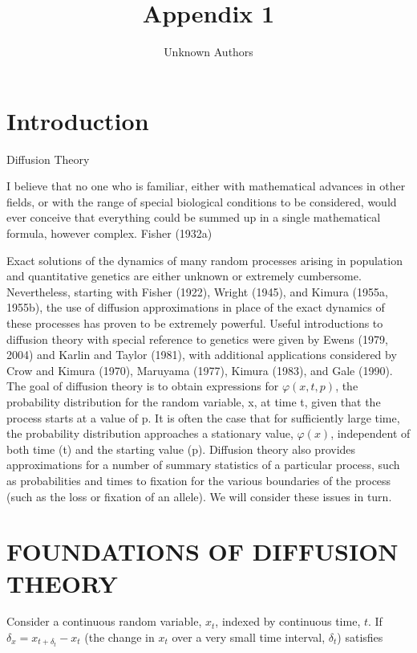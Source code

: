 \documentclass{article}
\title{Appendix 1}
\author{Unknown Authors}
\date{}
\begin{document}
\maketitle

\begin{abstract}

\end{abstract}

\section{Introduction}
Diffusion Theory

I believe that no one who is familiar, either with mathematical advances in other fields, or with the range of special biological conditions to be considered, would ever conceive that everything could be summed up in a single mathematical formula, however complex. Fisher (1932a)

Exact solutions of the dynamics of many random processes arising in population and quantitative genetics are either unknown or extremely cumbersome. Nevertheless, starting with Fisher (1922), Wright (1945), and Kimura (1955a, 1955b), the use of diffusion approximations in place of the exact dynamics of these processes has proven to be extremely powerful. Useful introductions to diffusion theory with special reference to genetics were given by Ewens (1979, 2004) and Karlin and Taylor (1981), with additional applications considered by Crow and Kimura (1970), Maruyama (1977), Kimura (1983), and Gale (1990). The goal of diffusion theory is to obtain expressions for  $ \varphi(x, t, p) $, the probability distribution for the random variable, x, at time t, given that the process starts at a value of p. It is often the case that for sufficiently large time, the probability distribution approaches a stationary value,  $ \varphi(x) $, independent of both time (t) and the starting value (p). Diffusion theory also provides approximations for a number of summary statistics of a particular process, such as probabilities and times to fixation for the various boundaries of the process (such as the loss or fixation of an allele). We will consider these issues in turn.

\section{FOUNDATIONS OF DIFFUSION THEORY}
Consider a continuous random variable,  $ x_t $, indexed by continuous time,  $ t $. If  $ \delta_x = x_{t+\delta_t} - x_t $ (the change in  $ x_t $ over a very small time interval,  $ \delta_t $) satisfies
\end{document}
